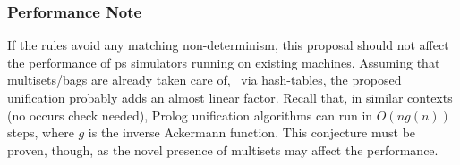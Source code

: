 \subsubsection{Performance Note}
If the rules avoid any matching non-determinism, 
this proposal should not affect the performance of \gls{ps} simulators running on existing machines.
Assuming that multisets/bags are already taken care of, \eg{}~via hash-tables,
the proposed unification probably adds an almost linear factor.
Recall that, in similar contexts (no occurs check needed), 
Prolog unification algorithms can run in \(O(n g(n))\) steps,
where \(g\) is the inverse Ackermann function.
This conjecture must be proven, though, 
as the novel presence of multisets may affect the performance.

